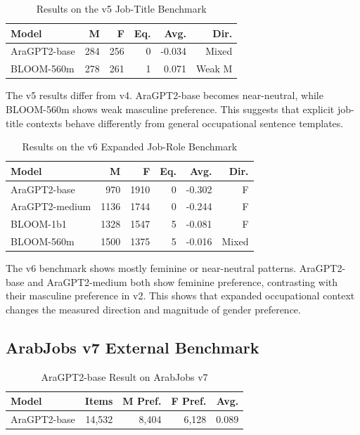 \documentclass[conference]{IEEEtran}
\begin{document}
\begin{table}[htbp]
\caption{Results on the v5 Job-Title Benchmark}
\begin{center}
\begin{tabular}{lrrrrr}
\toprule
Model & M & F & Eq. & Avg. & Dir. \\
\midrule
AraGPT2-base & 284 & 256 & 0 & -0.034 & Mixed \\
BLOOM-560m & 278 & 261 & 1 & 0.071 & Weak M \\
\bottomrule
\end{tabular}
\label{tab:v5}
\end{center}
\end{table}

The v5 results differ from v4. AraGPT2-base becomes near-neutral, while BLOOM-560m shows weak masculine preference. This suggests that explicit job-title contexts behave differently from general occupational sentence templates.

\begin{table}[htbp]
\caption{Results on the v6 Expanded Job-Role Benchmark}
\begin{center}
\begin{tabular}{lrrrrr}
\toprule
Model & M & F & Eq. & Avg. & Dir. \\
\midrule
AraGPT2-base & 970 & 1910 & 0 & -0.302 & F \\
AraGPT2-medium & 1136 & 1744 & 0 & -0.244 & F \\
BLOOM-1b1 & 1328 & 1547 & 5 & -0.081 & F \\
BLOOM-560m & 1500 & 1375 & 5 & -0.016 & Mixed \\
\bottomrule
\end{tabular}
\label{tab:v6}
\end{center}
\end{table}

The v6 benchmark shows mostly feminine or near-neutral patterns. AraGPT2-base and AraGPT2-medium both show feminine preference, contrasting with their masculine preference in v2. This shows that expanded occupational context changes the measured direction and magnitude of gender preference.

\subsection{ArabJobs v7 External Benchmark}

\begin{table}[htbp]
\caption{AraGPT2-base Result on ArabJobs v7}
\begin{center}
\begin{tabular}{lrrrr}
\toprule
Model & Items & M Pref. & F Pref. & Avg. \\
\midrule
AraGPT2-base & 14,532 & 8,404 & 6,128 & 0.089 \\
\bottomrule
\end{tabular}
\label{tab:arabjobs}
\end{center}
\end{table}
\end{document}
